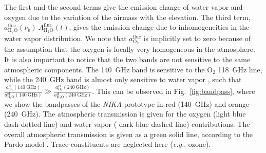   The first and the second terms give the emission change of water vapor and oxygen due to the variation of the airmass with the elevation. The third term, $a_{\mathrm{H}_2\mathrm{O}} ^{\mathrm{fluc}} (\nu_b) \ A_{\mathrm{H}_2\mathrm{O}}^{\mathrm{fluc}} (t)$, gives the emission change due to inhomogeneities in the water vapor distribution. We note that $a_{\mathrm{O}_2}^{\mathrm{fluc}}$ is implicitly set to zero because of the assumption that the oxygen is locally very homogeneous in the atmosphere. It is also important to notice that the two bands are not sensitive to the same atmospheric components. The 140~GHz band is sensitive to the $\mathrm{O}_2$ 118~GHz line, while the 240~GHz band is almost only sensitive to water vapor \citep{Pardo}, such that $\frac{a_{\mathrm{O}_2} ^{\mathrm{el}} (140 \ \mathrm{GHz})}{a_{\mathrm{H}_2\mathrm{O}} ^{\mathrm{el}} (140 \ \mathrm{GHz})} \gg \frac{a_{\mathrm{O}_2} ^{\mathrm{el}} (240 \ \mathrm{GHz})}{a_{\mathrm{H}_2\mathrm{O}} ^{\mathrm{el}} (240 \ \mathrm{GHz})}$. This can be observed in Fig.~\ref{fig:bandpass}, where we show the bandpasses of the {\it NIKA} prototype in red (140~GHz) and orange (240~GHz). The atmospheric transmission is given for the oxygen (light blue dash-dotted line) and water vapor ( dark blue dashed line) contributions. The overall atmospheric transmission is given as a green solid line, according to the Pardo model \citep{Pardo}. Trace constituents are neglected here ({\it e.g.}, ozone).

